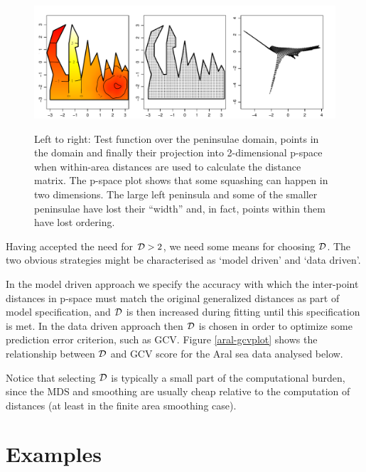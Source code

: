 \documentclass[useAMS, referee]{biom}
\begin{document}
\begin{figure}
\centering
\includegraphics[width=\textwidth]{examples/wt2/wt2-plot.pdf} \\
\caption{Left to right: Test function over the peninsulae domain, points in the domain and finally their projection into 2-dimensional p-space when within-area distances are used to calculate the distance matrix. The p-space plot shows that some squashing can happen in two dimensions. The large left peninsula and some of the smaller peninsulae have lost their ``width'' and, in fact, points within them have lost ordering.}
\label{wt2-plot}
\end{figure}

Having accepted the need for ${\cal D}>2$, we need some means for choosing $\cal D$. The two obvious strategies might be characterised as `model driven' and `data driven'. 

In the model driven approach we specify the accuracy with which the inter-point distances in p-space must match the original generalized distances as part of model specification, and $\cal D$ is then increased during fitting until this specification is met. In the data driven approach then $\cal D$ is chosen in order to optimize some prediction error criterion, such as GCV.  Figure \ref{aral-gcvplot} shows the relationship between $\cal D$ and GCV score for the Aral sea data analysed below.

Notice that selecting $\cal D$ is typically a small part of the computational burden, since the MDS and smoothing are usually cheap relative to the computation of distances (at least in the finite area smoothing case).


\section{Examples}
\label{examples}
\end{document}
